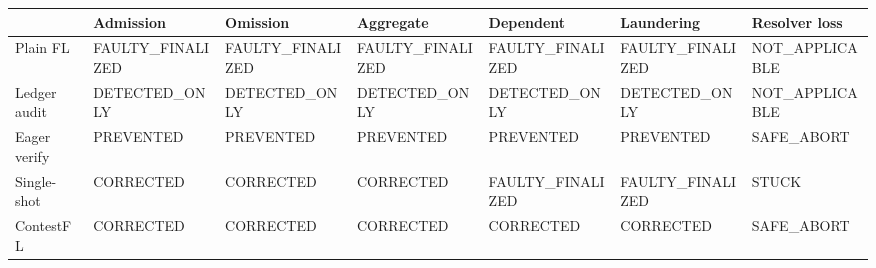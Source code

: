 \begin{tabular}{lllllll}
\toprule
 & Admission & Omission & Aggregate & Dependent & Laundering & Resolver loss \\
\midrule
Plain FL & FAULTY_FINALIZED & FAULTY_FINALIZED & FAULTY_FINALIZED & FAULTY_FINALIZED & FAULTY_FINALIZED & NOT_APPLICABLE \\
Ledger audit & DETECTED_ONLY & DETECTED_ONLY & DETECTED_ONLY & DETECTED_ONLY & DETECTED_ONLY & NOT_APPLICABLE \\
Eager verify & PREVENTED & PREVENTED & PREVENTED & PREVENTED & PREVENTED & SAFE_ABORT \\
Single-shot & CORRECTED & CORRECTED & CORRECTED & FAULTY_FINALIZED & FAULTY_FINALIZED & STUCK \\
ContestFL & CORRECTED & CORRECTED & CORRECTED & CORRECTED & CORRECTED & SAFE_ABORT \\
\bottomrule
\end{tabular}
